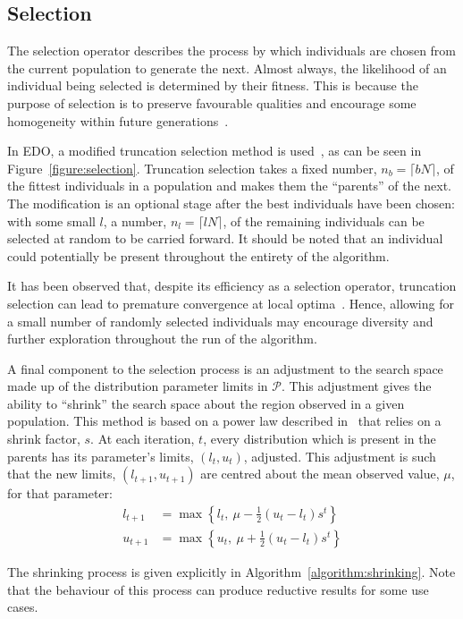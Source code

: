 \subsection{Selection}

The selection operator describes the process by which individuals are chosen
from the current population to generate the next. Almost always, the likelihood
of an individual being selected is determined by their fitness. This is because
the purpose of selection is to preserve favourable qualities and encourage some
homogeneity within future generations~\cite{Back1994}.



In EDO, a modified truncation selection method is used~\cite{Jebari2013}, as can
be seen in Figure~\ref{figure:selection}. Truncation selection takes a fixed
number, \(n_b = \lceil bN\rceil\), of the fittest individuals in a population
and makes them the ``parents'' of the next. The modification is an optional
stage after the best individuals have been chosen: with some small \(l\), a
number, \(n_l = \lceil lN\rceil\), of the remaining individuals can be selected
at random to be carried forward. It should be noted that an individual could
potentially be present throughout the entirety of the algorithm.

It has been observed that, despite its efficiency as a selection operator,
truncation selection can lead to premature convergence at local
optima~\cite{Jebari2013, Tatsuya2002}. Hence, allowing for a small number of
randomly selected individuals may encourage diversity and further exploration
throughout the run of the algorithm.

A final component to the selection process is an adjustment to the search space
made up of the distribution parameter limits in \(\mathcal{P}\). This adjustment
gives the ability to ``shrink'' the search space about the region observed in a
given population. This method is based on a power law described
in~\cite{Amirjanov2016} that relies on a shrink factor, \(s\). At each
iteration, \(t\), every distribution which is present in the parents has its
parameter's limits, \(\left(l_t, u_t\right)\), adjusted. This adjustment is such
that the new limits, \(\left(l_{t+1}, u_{t+1}\right)\) are centred about the
mean observed value, \(\mu\), for that parameter:
\begin{align}
    \label{eq:shrinking_lower}
    l_{t+1}&= \max \left\{l_t, \ \mu - \frac{1}{2} (u_t - l_t) s^t\right\}\\
    \label{eq:shrinking_upper}
    u_{t+1}&= \max \left\{u_t, \ \mu + \frac{1}{2} (u_t - l_t) s^t\right\}
\end{align}

The shrinking process is given explicitly in
Algorithm~\ref{algorithm:shrinking}. Note that the behaviour of this process can 
produce reductive results for some use cases.


